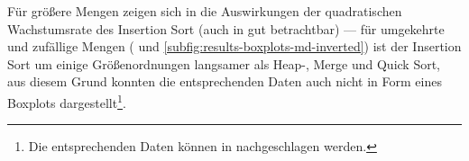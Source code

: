 

Für größere Mengen zeigen sich in  die Auswirkungen der quadratischen Wachstumsrate des Insertion Sort (auch in  gut betrachtbar) --- für umgekehrte und zufällige Mengen ( und \ref{subfig:results-boxplots-md-inverted}) ist der Insertion Sort um einige Größenordnungen langsamer als Heap-, Merge und Quick Sort, aus diesem Grund konnten die entsprechenden Daten auch nicht in Form eines Boxplots dargestellt\footnote{Die entsprechenden Daten können in  nachgeschlagen werden.}.




